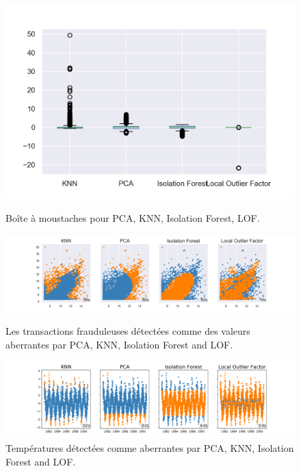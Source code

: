 \begin{figure}[H]
    \includegraphics[width=.45\textwidth]{ADOA/Images/sales_boxplot.png}
    \label{fig_sal12}
    \caption{Boîte à moustaches pour PCA, KNN, Isolation Forest, LOF.}%
\end{figure}

\begin{figure}[ht!]
    \centering
    \includegraphics[width=1.06\textwidth]{ADOA/Images/sale_algo.png}
    \caption{Les transactions frauduleuses détectées comme des valeurs aberrantes par PCA, KNN, Isolation Forest and LOF.}%
    \label{fig_sal2}
    \includegraphics[width=1.06\textwidth]{ADOA/Images/Temp2.png}
    \caption{Températures détectées comme aberrantes par PCA, KNN, Isolation Forest and LOF.}%
    \label{fig2t1}
\end{figure}

